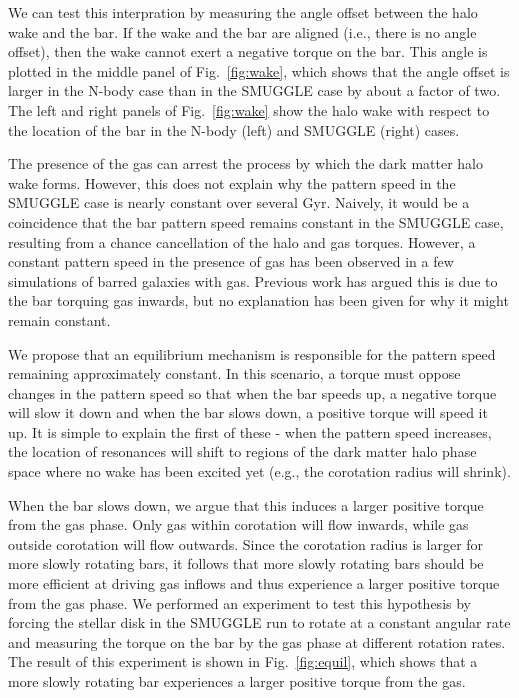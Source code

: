 \documentclass{natureprintstyle}
\begin{document}
We can test this interpration by measuring the angle offset between the halo
wake and the bar. If the wake and the bar are aligned (i.e., there is no angle
offset), then the wake cannot exert a negative torque on the bar. This angle
is plotted in the middle panel of Fig.~\ref{fig:wake}, which shows that the
angle offset is larger in the N-body case than in the SMUGGLE case by about a
factor of two. The left and right panels of Fig.~\ref{fig:wake} show the halo
wake with respect to the location of the bar in the N-body (left) and SMUGGLE
(right) cases.

The presence of the gas can arrest the process by which the dark matter halo
wake forms. However, this does not explain why the pattern speed in the
SMUGGLE case is nearly constant over several Gyr. Naively, it would be a
coincidence that the bar pattern speed remains constant in the SMUGGLE case,
resulting from a chance cancellation of the halo and gas torques. However, a
constant pattern speed in the presence of gas has been observed in a few
simulations of barred galaxies with gas.\cite{1993AA...268...65F,
2010ApJ...719.1470V} Previous work has argued this is due to the bar torquing
gas inwards, but no explanation has been given for why it might remain
constant.

We propose that an equilibrium mechanism is responsible for the pattern speed
remaining approximately constant. In this scenario, a torque must oppose
changes in the pattern speed so that when the bar speeds up, a negative torque
will slow it down and when the bar slows down, a positive torque will speed it
up. It is simple to explain the first of these - when the pattern speed
increases, the location of resonances will shift to regions of the dark matter
halo phase space where no wake has been excited yet (e.g., the corotation
radius will shrink).

When the bar slows down, we argue that this induces a larger positive torque
from the gas phase. Only gas within corotation will flow inwards, while gas
outside corotation will flow outwards.\cite{2011MNRAS.415.1027H} Since the
corotation radius is larger for more slowly rotating bars, it follows that
more slowly rotating bars should be more efficient at driving gas inflows and
thus experience a larger positive torque from the gas phase. We performed an
experiment to test this hypothesis by forcing the stellar disk in the SMUGGLE
run to rotate at a constant angular rate and measuring the torque on the bar
by the gas phase at different rotation rates. The result of this experiment is
shown in Fig.~\ref{fig:equil}, which shows that a more slowly rotating bar
experiences a larger positive torque from the gas.
\end{document}
